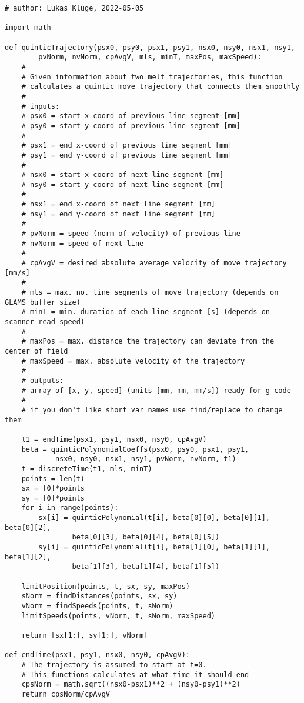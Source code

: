 \begin{verbatim}
# author: Lukas Kluge, 2022-05-05

import math

def quinticTrajectory(psx0, psy0, psx1, psy1, nsx0, nsy0, nsx1, nsy1,
        pvNorm, nvNorm, cpAvgV, mls, minT, maxPos, maxSpeed):
    #
    # Given information about two melt trajectories, this function
    # calculates a quintic move trajectory that connects them smoothly
    #
    # inputs:
    # psx0 = start x-coord of previous line segment [mm]
    # psy0 = start y-coord of previous line segment [mm]
    #
    # psx1 = end x-coord of previous line segment [mm]
    # psy1 = end y-coord of previous line segment [mm]
    #
    # nsx0 = start x-coord of next line segment [mm]
    # nsy0 = start y-coord of next line segment [mm]
    #
    # nsx1 = end x-coord of next line segment [mm]
    # nsy1 = end y-coord of next line segment [mm]
    #
    # pvNorm = speed (norm of velocity) of previous line
    # nvNorm = speed of next line
    #
    # cpAvgV = desired absolute average velocity of move trajectory [mm/s]
    #
    # mls = max. no. line segments of move trajectory (depends on GLAMS buffer size)
    # minT = min. duration of each line segment [s] (depends on scanner read speed)
    # 
    # maxPos = max. distance the trajectory can deviate from the center of field
    # maxSpeed = max. absolute velocity of the trajectory
    #
    # outputs:
    # array of [x, y, speed] (units [mm, mm, mm/s]) ready for g-code
    #
    # if you don't like short var names use find/replace to change them

    t1 = endTime(psx1, psy1, nsx0, nsy0, cpAvgV)
    beta = quinticPolynomialCoeffs(psx0, psy0, psx1, psy1,
            nsx0, nsy0, nsx1, nsy1, pvNorm, nvNorm, t1)
    t = discreteTime(t1, mls, minT)
    points = len(t)
    sx = [0]*points
    sy = [0]*points
    for i in range(points):
        sx[i] = quinticPolynomial(t[i], beta[0][0], beta[0][1], beta[0][2],
                beta[0][3], beta[0][4], beta[0][5])
        sy[i] = quinticPolynomial(t[i], beta[1][0], beta[1][1], beta[1][2],
                beta[1][3], beta[1][4], beta[1][5])

    limitPosition(points, t, sx, sy, maxPos)
    sNorm = findDistances(points, sx, sy)
    vNorm = findSpeeds(points, t, sNorm)
    limitSpeeds(points, vNorm, t, sNorm, maxSpeed)

    return [sx[1:], sy[1:], vNorm]

def endTime(psx1, psy1, nsx0, nsy0, cpAvgV):
    # The trajectory is assumed to start at t=0.
    # This functions calculates at what time it should end
    cpsNorm = math.sqrt((nsx0-psx1)**2 + (nsy0-psy1)**2)
    return cpsNorm/cpAvgV


\end{verbatim}
